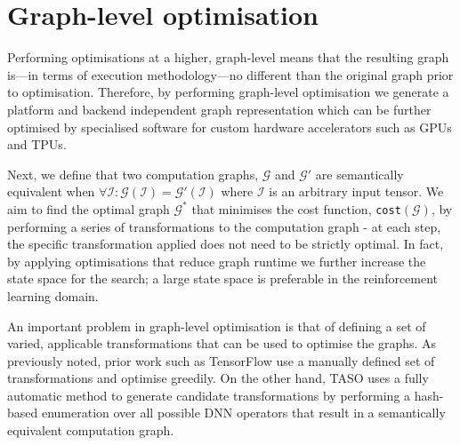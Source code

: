 \section{Graph-level optimisation}

Performing optimisations at a higher, graph-level means that the resulting graph is---in terms of execution methodology---no different than the original graph prior to optimisation. Therefore, by performing graph-level optimisation we generate a platform and backend independent graph representation which can be further optimised by specialised software for custom hardware accelerators such as GPUs and TPUs.

Next, we define that two computation graphs, $\mathcal{G}$ and $\mathcal{G}'$ are semantically equivalent when $\forall \mathcal{I} : \mathcal{G}(\mathcal{I}) = \mathcal{G}'(\mathcal{I})$ where $\mathcal{I}$ is an arbitrary input tensor. We aim to find the optimal graph $\mathcal{G}^*$ that minimises the cost function, \texttt{cost}$(\mathcal{G})$, by performing a series of transformations to the computation graph - at each step, the specific transformation applied does not need to be strictly optimal. In fact, by applying optimisations that reduce graph runtime we further increase the state space for the search; a large state space is preferable in the reinforcement learning domain.

An important problem in graph-level optimisation is that of defining a set of varied, applicable transformations that can be used to optimise the graphs. As previously noted, prior work such as TensorFlow use a manually defined set of transformations and optimise greedily. On the other hand, TASO uses a fully automatic method to generate candidate transformations by performing a hash-based enumeration over all possible DNN operators that result in a semantically equivalent computation graph.

